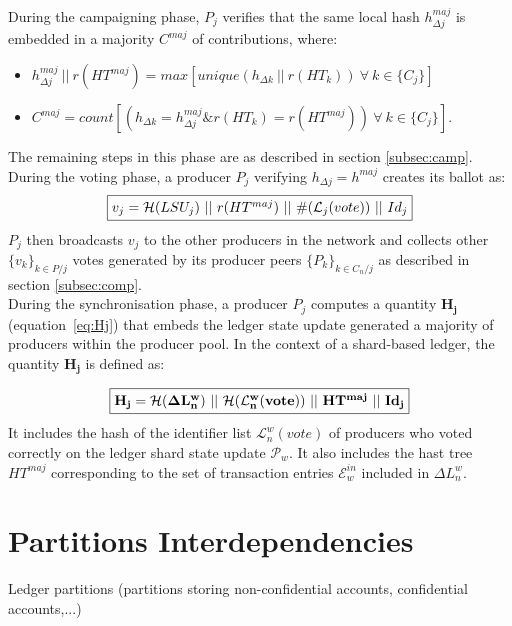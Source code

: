 During the campaigning phase, $P_j$ verifies that the same local hash $h^{maj}_{\Delta j}$ is embedded in a majority $C^{maj}$ of contributions, where:
\begin{itemize}
\item $h^{maj}_{\Delta j}~||~r(HT^{maj}) = max[unique(h_{\Delta k}~||~r(HT_k))~\forall~k\in\{C_j\}]$
\item $C^{maj} = count[(h_{\Delta k} = h^{maj}_{\Delta j} \& r(HT_k) = r(HT^{maj}))~\forall~k\in\{C_j\}]$. 
\end{itemize}

The remaining steps in this phase are as described in section \ref{subsec:camp}.\\

During the voting phase, a producer $P_j$ verifying $h_{\Delta j}=h^{maj}$ creates its ballot as:
\begin{equation}
\label{eq:vj_shard}
\fbox{$v_j = \mathcal{H}(LSU_j)~||~r(HT^{maj})~||~\#(\mathcal{L}_j(vote))~||~Id_j$}
\end{equation}
$P_j$ then broadcasts $v_j$ to the other producers in the network and collects other $\{v_k\}_{k \in P/j}$ votes generated by its producer peers $\{P_k\}_{k \in C_n/j}$ as described in section \ref{subsec:comp}.\\

During the synchronisation phase, a producer $P_j$ computes a quantity $\mathbf{H_{j}}$ (equation~\eqref{eq:Hj}) that embeds the ledger state update generated a majority of producers within the producer pool. In the context of a shard-based ledger, the  quantity $\mathbf{H_{j}}$ is defined as:

 \begin{equation} 
\fbox{$\mathbf{H_{j} = \mathcal{H}(\Delta L^w_n)~||~\mathcal{H}(\mathcal{L}^{w}_{n}(vote))~||~HT^{maj}~||~Id_j}$}
\label{eq:Hj_shard}
\end{equation}
It includes the hash of the identifier list $\mathcal{L}^{w}_{n}(vote)$ of producers who voted correctly on the ledger shard state update $\mathcal{P}_w$.
It also includes the hast tree $HT^{maj}$ corresponding to the set of transaction entries $\mathcal{E}^{in}_w$ included in $\Delta L^w_n$. 

\section{Partitions Interdependencies}

Ledger partitions (partitions storing non-confidential accounts, confidential accounts,...)